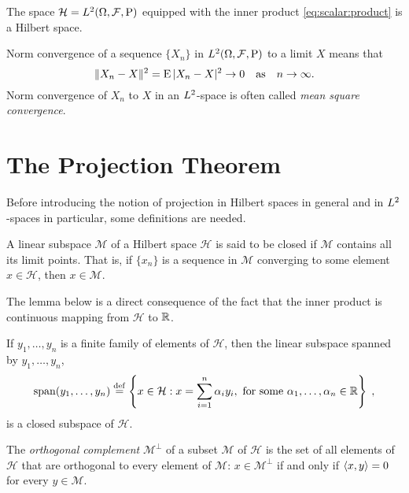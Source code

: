 \begin{prop}
The space $\mathcal{H}= L^2(\Omega,\mathcal{F},\operatorname{P})$ equipped with
the inner product \eqref{eq:scalar:product} is a Hilbert space.
\end{prop}

 Norm convergence of a sequence
$\{X_n \}$ in $L^2(\Omega,\mathcal{F},\operatorname{P})$ to a limit $X$ means that
$$
\| X_n - X\|^2 = \operatorname{E} |X_n - X|^2 \to 0 \quad \text{as} \quad n \to \infty.
$$
Norm convergence of $X_n$ to $X$ in an $L^2$-space is often called
\emph{mean square convergence}.


\section{The Projection Theorem}
Before introducing the notion of projection in Hilbert spaces
in general and in $L^2$-spaces in particular, some definitions are needed.

\begin{defi}
A linear subspace $\mathcal{M}$ of a Hilbert space $\mathcal{H}$ is said to
be closed if $\mathcal{M}$ contains all its limit points.
That is, if $\{x_n\}$ is a sequence in $\mathcal{M}$ converging to some
element $x\in\mathcal{H}$, then $x\in\mathcal{M}$.
\end{defi}

The lemma below is a direct consequence of the fact that the inner product is
continuous mapping from $\mathcal{H}$ to $\mathbb{R}$.

\begin{lem}
  If $y_1, \dots, y_n$ is a finite family of elements of $\mathcal{H}$,
  then the linear subspace spanned by $y_1, \dots, y_n$,
  \[
    \operatorname{span}(y_1, \dots, y_n) \stackrel{\mathrm{def}}{=}
    \left\{ x\in \mathcal{H} : x = \sum_{i=1}^n \alpha_i y_i, \
      \text{for some $\alpha_1, \dots, \alpha_n \in \mathbb{R}$} \right\} \; ,
  \]
  is a  closed subspace of $\mathcal{H}$.
\end{lem}

\begin{defi}
The \emph{orthogonal complement} $\mathcal{M}^\perp$ of a subset $\mathcal{M}$
of $\mathcal{H}$ is the set of all elements of $\mathcal{H}$
that are orthogonal to every element of $\mathcal{M}$:
$x \in \mathcal{M}^\perp$ if and only if $\langle x, y \rangle=0$ for every
$y \in \mathcal{M}$.
\end{defi}

